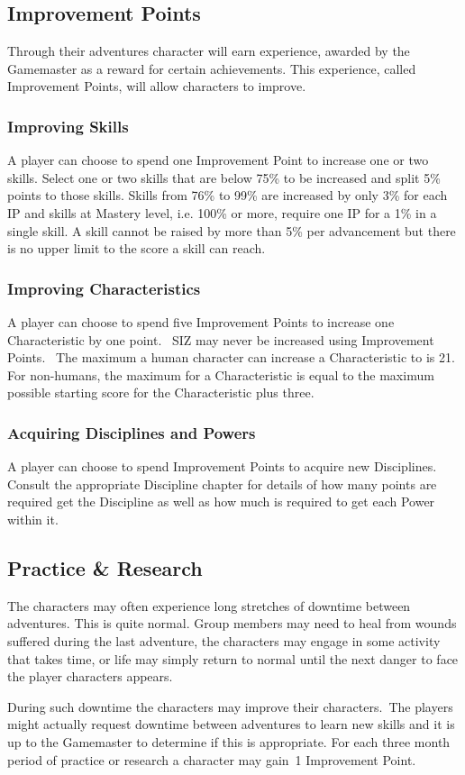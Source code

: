 \subsection{Improvement Points}
\label{ssec:improvement-points}
Through their adventures character will earn experience, awarded by the Gamemaster as a reward for certain achievements. This experience, called Improvement Points, will allow characters to improve.

\subsubsection{Improving Skills}
A player can choose to spend one Improvement Point to increase one or two skills.
Select one or two skills that are below 75\% to be increased and split 5\% points to those skills. Skills from 76\% to 99\% are increased by only 3\% for each IP and skills at Mastery level, i.e. 100\% or more, require one IP for a 1\% in a single skill.
A skill cannot be raised by more than 5\% per advancement but there is no upper limit to the score a skill can reach. 

\subsubsection{Improving Characteristics}
A player can choose to spend five Improvement Points to increase one Characteristic by one point. 
SIZ may never be increased using Improvement Points. 
The maximum a human character can increase a Characteristic to is 21. For non-humans, the maximum for a Characteristic is equal to the maximum possible starting score for the Characteristic plus three.

\subsubsection{Acquiring Disciplines and Powers}
A player can choose to spend Improvement Points to acquire new Disciplines. Consult the appropriate Discipline chapter for details of how many points are required get the Discipline as well as how much is required to get each Power within it.

\subsection{Practice \& Research}
The characters may often experience long stretches of downtime between adventures. This is quite normal. Group members may need to heal from wounds suffered during the last adventure, the characters may engage in some activity that takes time, or life may simply return to normal until the next danger to face the player characters appears.

During such downtime the characters may improve their characters. The players might actually request downtime between adventures to learn new skills and it is up to the Gamemaster to determine if this is appropriate.  
For each three month period of practice or research a character may gain 1 Improvement Point. 


